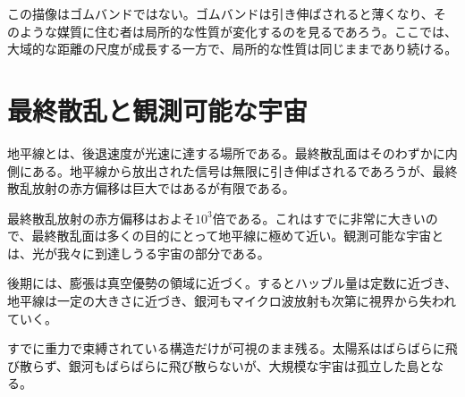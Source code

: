 \begin{classroomqa}
\end{classroomqa}

この描像はゴムバンドではない。ゴムバンドは引き伸ばされると薄くなり、そのような媒質に住む者は局所的な性質が変化するのを見るであろう。ここでは、大域的な距離の尺度が成長する一方で、局所的な性質は同じままであり続ける。

\section{最終散乱と観測可能な宇宙}

地平線とは、後退速度が光速に達する場所である。最終散乱面はそのわずかに内側にある。地平線から放出された信号は無限に引き伸ばされるであろうが、最終散乱放射の赤方偏移は巨大ではあるが有限である。

\begin{classroomqa}
\end{classroomqa}

最終散乱放射の赤方偏移はおよそ\(10^3\)倍である。これはすでに非常に大きいので、最終散乱面は多くの目的にとって地平線に極めて近い。観測可能な宇宙とは、光が我々に到達しうる宇宙の部分である。

後期には、膨張は真空優勢の領域に近づく。するとハッブル量は定数に近づき、地平線は一定の大きさに近づき、銀河もマイクロ波放射も次第に視界から失われていく。

\begin{classroomqa}
\end{classroomqa}

すでに重力で束縛されている構造だけが可視のまま残る。太陽系はばらばらに飛び散らず、銀河もばらばらに飛び散らないが、大規模な宇宙は孤立した島となる。

